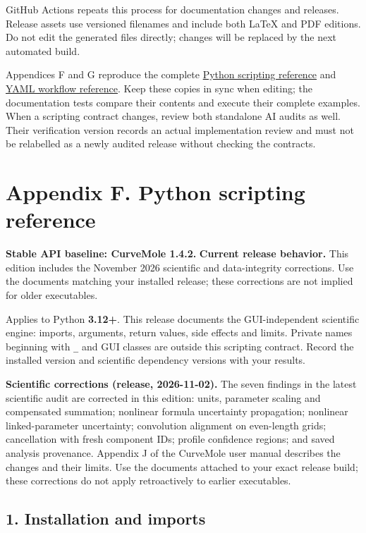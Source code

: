 \documentclass[
  10pt,
  a4paper,
  oneside]{scrreprt}
\begin{document}
GitHub Actions repeats this process for documentation changes and
releases. Release assets use versioned filenames and include both LaTeX
and PDF editions. Do not edit the generated files directly; changes will
be replaced by the next automated build.

Appendices F and G reproduce the complete \href{python-api.md}{Python
scripting reference} and \href{workflows.md}{YAML workflow reference}.
Keep these copies in sync when editing; the documentation tests compare
their contents and execute their complete examples. When a scripting
contract changes, review both standalone AI audits as well. Their
verification version records an actual implementation review and must
not be relabelled as a newly audited release without checking the
contracts.

\hypertarget{appendix-f.-python-scripting-reference}{%
\chapter{Appendix F. Python scripting
reference}\label{appendix-f.-python-scripting-reference}}

\textbf{Stable API baseline: CurveMole 1.4.2.} \textbf{Current release
behavior.} This edition includes the November 2026 scientific and
data-integrity corrections. Use the documents matching your installed
release; these corrections are not implied for older executables.

Applies to Python \textbf{3.12+}. This release documents the
GUI-independent scientific engine: imports, arguments, return values,
side effects and limits. Private names beginning with \texttt{\_} and
GUI classes are outside this scripting contract. Record the installed
version and scientific dependency versions with your results.

\textbf{Scientific corrections (release, 2026-11-02).} The seven
findings in the latest scientific audit are corrected in this edition:
units, parameter scaling and compensated summation; nonlinear formula
uncertainty propagation; nonlinear linked-parameter uncertainty;
convolution alignment on even-length grids; cancellation with fresh
component IDs; profile confidence regions; and saved analysis
provenance. Appendix J of the CurveMole user manual describes the
changes and their limits. Use the documents attached to your exact
release build; these corrections do not apply retroactively to earlier
executables.

\hypertarget{installation-and-imports}{%
\section{1. Installation and imports}\label{installation-and-imports}}
\end{document}
